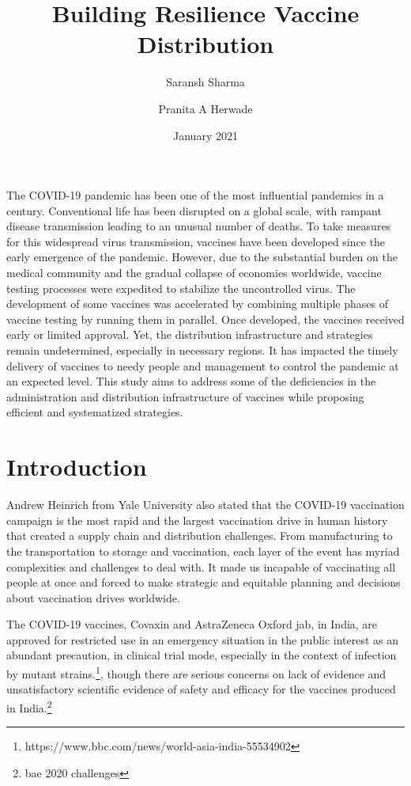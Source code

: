 \documentclass{article}
\begin{document}
\title{Building Resilience Vaccine Distribution}
\author{Saransh Sharma }
\author{Pranita A Herwade}
\date{January 2021}


\maketitle


\abstract

The COVID-19 pandemic has been one of the most inﬂuential pandemics in a century. Conventional life has been disrupted on a global scale, with rampant disease transmission leading to an unusual number of deaths. To take measures for this widespread virus transmission, vaccines have been developed since the early emergence of the pandemic. However, due to the substantial burden on the medical community and the gradual collapse of economies worldwide, vaccine testing processes were expedited to stabilize the uncontrolled virus. The development of some vaccines was accelerated by combining multiple phases of vaccine testing by running them in parallel. Once developed, the vaccines received early or limited approval. Yet, the distribution infrastructure and strategies remain undetermined, especially in necessary regions. It has impacted the timely delivery of vaccines to needy people and management to control the pandemic at an expected level. This study aims to address some of the deﬁciencies in the administration and distribution infrastructure of vaccines while proposing eﬃcient and systematized strategies.

\section{Introduction}
Andrew Heinrich from Yale University also stated that the COVID-19 vaccination campaign is the most rapid and the largest vaccination drive in human history that created a supply chain and distribution challenges. From manufacturing to the transportation to storage and vaccination, each layer of the event has myriad complexities and challenges to deal with. It made us incapable of vaccinating all people at once and forced to make strategic and equitable planning and decisions about vaccination drives worldwide.  

The COVID-19 vaccines, Covaxin and AstraZeneca Oxford jab, in India, are approved for restricted use in an emergency situation in the public interest as an abundant precaution, in clinical trial mode, especially in the context of infection by mutant strains.\footnote{https://www.bbc.com/news/world-asia-india-55534902}, though there are serious concerns on lack of evidence and unsatisfactory scientific evidence of safety and efficacy for the vaccines produced in India.\footnote{bae 2020 challenges} 
\end{document}

